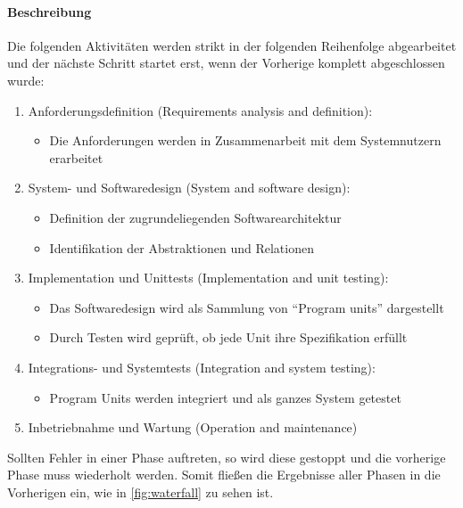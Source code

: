 \documentclass[
    ngerman,
    color=3b,
    summary,
    boxarc,
    main,
]{rubos-tuda-template}
\begin{document}
\paragraph{Beschreibung}
Die folgenden Aktivitäten werden strikt in der folgenden Reihenfolge abgearbeitet und der nächste Schritt startet erst, wenn der Vorherige komplett abgeschlossen wurde:
\begin{enumerate}
    \item Anforderungsdefinition (Requirements analysis and definition):\begin{itemize}
              \item Die Anforderungen werden in Zusammenarbeit mit dem Systemnutzern erarbeitet
          \end{itemize}
    \item System- und Softwaredesign (System and software design):\begin{itemize}
              \item Definition der zugrundeliegenden Softwarearchitektur
              \item Identifikation der Abstraktionen und Relationen
          \end{itemize}
    \item Implementation und Unittests (Implementation and unit
          testing):\begin{itemize}
              \item Das Softwaredesign wird als Sammlung von \enquote{Program units} dargestellt
              \item Durch Testen wird geprüft, ob jede Unit ihre Spezifikation erfüllt
          \end{itemize}
    \item Integrations- und Systemtests (Integration and system
          testing):\begin{itemize}
              \item Program Units werden integriert und als ganzes System getestet
          \end{itemize}
    \item Inbetriebnahme und Wartung (Operation and maintenance)
\end{enumerate}

Sollten Fehler in einer Phase auftreten, so wird diese gestoppt und die vorherige Phase muss wiederholt werden. Somit fließen die Ergebnisse aller Phasen in die Vorherigen ein, wie in \ref{fig:waterfall} zu sehen ist.
\end{document}
